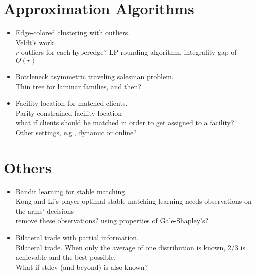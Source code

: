 \documentclass{article}
\begin{document}
\section{Approximation Algorithms}
\begin{itemize}
\item Edge-colored clustering with outliers.\\
Veldt's work\\
$r$ outliers for each hyperedge? LP-rounding algorithm, integrality gap of $O(r)$

\item Bottleneck asymmetric traveling salesman problem.\\
Thin tree for laminar families, and then?

\item Facility location for matched clients.\\
Parity-constrained facility location\\
what if clients should be matched in order to get assigned to a facility?\\
Other settings, e.g., dynamic or online?


\end{itemize}

\section{Others}
\begin{itemize}
\item Bandit learning for stable matching.\\
Kong and Li's player-optimal stable matching learning needs observations on the arms' decisions \\
remove these observations? using properties of Gale-Shapley's?

\item Bilateral trade with partial information.\\
Bilateral trade. When only the average of one distribution is known, 2/3 is achievable and the best possible.\\
What if stdev (and beyond) is also known?
\end{itemize}
\end{document}

